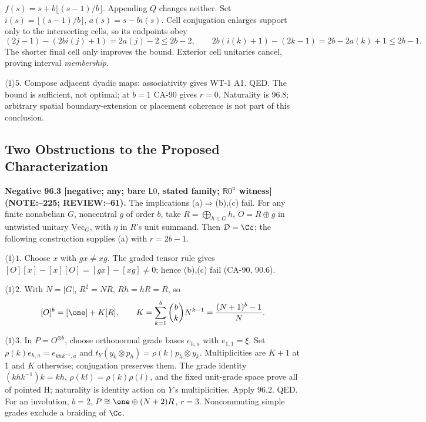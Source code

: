 \(f(s)=s+b\lfloor(s-1)/b\rfloor\). Appending \(Q\) changes neither. Set \(i(s)=\lfloor(s-1)/b\rfloor\),
\(a(s)=s-bi(s)\). Cell conjugation enlarges support only to the intersecting cells, so its endpoints obey
\[
 (2j-1)-(2bi(j)+1)=2a(j)-2\le2b-2,\qquad
 2b(i(k)+1)-(2k-1)=2b-2a(k)+1\le2b-1.
\]
The shorter final cell only improves the bound. Exterior cell unitaries cancel, proving interval \emph{membership}.
\par\(\langle1\rangle5\). Compose adjacent dyadic maps: associativity gives WT-1 A1. QED.
The bound is sufficient, not optimal; at \(b=1\) CA-90 gives \(r=0\). Naturality is 96.8; arbitrary spatial
boundary-extension or placement coherence is not part of this conclusion.

\subsection{Two Obstructions to the Proposed Characterization}

\textbf{Negative 96.3 [negative; any; bare \(\mathsf L0\), stated family; \(\mathsf R0^u\) witness] (NOTE:--225; REVIEW:--61).}
The implications (a)\(\Rightarrow\)(b),(c) fail. For any finite nonabelian \(G\), noncentral \(g\) of order \(b\),
take \(R=\bigoplus_{h\in G}h\), \(O=R\oplus g\) in untwisted unitary \(\mathrm{Vec}_G\), with \(\eta\) in \(R\)'s unit summand.
Then \(\mathcal D=\Cc\); the following construction supplies (a) with \(r=2b-1\).
\par\(\langle1\rangle1\). Choose \(x\) with \(gx\ne xg\). The graded tensor rule gives
\([O][x]-[x][O]=[gx]-[xg]\ne0\); hence (b),(c) fail (CA-90, 90.6).
\par\(\langle1\rangle2\). With \(N=|G|\), \(R^2=NR\), \(Rh=hR=R\), so
\[
 [O]^b=[\one]+K[R],\qquad K=\sum_{k=1}^b\binom bk N^{k-1}=\frac{(N+1)^b-1}{N}.
\]
\par\(\langle1\rangle3\). In \(P=O^{\otimes b}\), choose orthonormal grade bases \(e_{h,a}\) with \(e_{1,1}=\xi\).
Set \(\rho(k)e_{h,a}=e_{khk^{-1},a}\) and \(t_Y(y_k\otimes p_h)=\rho(k)p_h\otimes y_k\).
Multiplicities are \(K+1\) at 1 and \(K\) otherwise; conjugation preserves them. The grade identity
\((khk^{-1})k=kh\), \(\rho(kl)=\rho(k)\rho(l)\), and the fixed unit-grade space prove all of pointed H;
naturality is identity action on \(Y\)'s multiplicities. Apply 96.2. QED.
For an involution, \(b=2\), \(P\cong\one\oplus(N+2)R\), \(r=3\). Noncommuting simple grades exclude a braiding of \(\Cc\).

